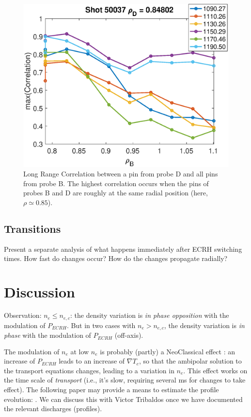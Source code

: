 \documentclass[preprint,12pt,authoryear]{elsarticle}
\begin{document}
\begin{figure}[!ht]
\centering
   \includegraphics[width=0.75\columnwidth]{Images/50037_LRC.eps}
   \caption{Long Range Correlation between a pin from probe D and all pins from probe B. The highest correlation occurs when the pins of probes B and D are roughly at the same radial position (here, $\rho \simeq 0.85$).}
   \label{Fig:Langmuir_LRC}
\end{figure}

\subsection{Transitions}

Present a separate analysis of what happens immediately after ECRH switching times. How fast do changes occur? How do the changes propagate radially? 

\section{Discussion}

Observation: $n_e \le n_{e,c}$: the density variation is {\em in phase opposition} with the modulation of $P_{ECRH}$. 
But in two cases with $n_e > n_{e,c}$, the density variation is {\em in phase} with the modulation of $P_{ECRH}$ (off-axis).

The modulation of $n_e$ at low $n_e$ is probably (partly) a NeoClassical effect \cite{Velasco:2012}: an increase of $P_{ECRH}$ leads to an increase of $\nabla T_e$, so that the ambipolar solution to the transport equations changes, leading to a variation in $n_e$. This effect works on the time scale of {\em transport} (i.e., it's slow, requiring several ms for changes to take effect).
The following paper may provide a means to estimate the profile evolution: \cite{Gutierrez-Tapia:2015}.
We can discuss this with Victor Tribaldos once we have documented the relevant discharges (profiles).
\end{document}
